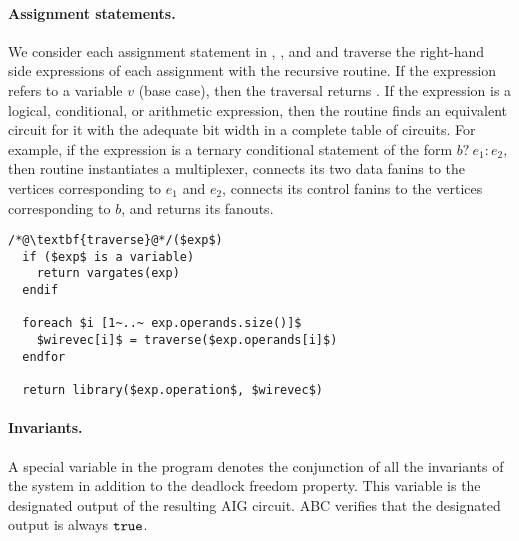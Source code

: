 \paragraph{Assignment statements.}
We consider each assignment statement in , ,
and  and traverse the right-hand side expressions of
each assignment with the recursive  routine. 
%
If the expression refers to a variable $v$ (base case), 
then the traversal returns . 
%
If the expression is a logical, conditional, or arithmetic expression, then
the  routine finds an equivalent circuit for it with the adequate bit
width in a complete table of circuits.
For example, if the expression is a ternary conditional statement of the
form $b?~e_1:e_2$, then routine  instantiates a multiplexer, 
connects its two data fanins to the vertices corresponding to $e_1$ and $e_2$, connects its control fanins to the vertices corresponding to $b$,
and returns its fanouts. 
%
\begin{lstlisting}
/*@\textbf{traverse}@*/($exp$)
  if ($exp$ is a variable) 
    return vargates(exp)
  endif

  foreach $i [1~..~ exp.operands.size()]$ 
    $wirevec[i]$ = traverse($exp.operands[i]$) 
  endfor

  return library($exp.operation$, $wirevec$)
\end{lstlisting}
%
%
%

\paragraph{Invariants.}
%
A special variable in the \caig program denotes the conjunction of all the invariants of the system in addition to the deadlock freedom property. This variable is the designated output of the resulting 
AIG circuit. ABC verifies that the designated output is always $\mathtt{true}$. 
%

